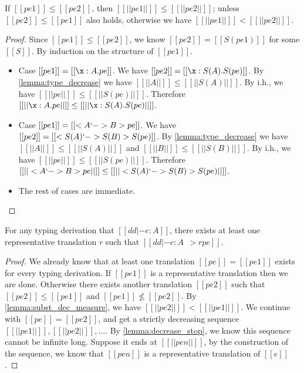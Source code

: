 \begin{lemma}
  \label{lemma:subst_dec_measure}
  If $[[pe1]] \leq [[pe2]]$, then $ {[[ ||pe1|| ]]} \leq [[ ||pe2|| ]]$; unless
  $[[pe2]] \leq [[pe1]]$ also holds, otherwise we have $[[ ||pe1|| ]] < [[ ||pe2|| ]]$.
\end{lemma}
\begin{proof}
  Since $[[ pe1  ]] \leq [[  pe2  ]]$, we know $[[ pe2  ]] = [[ S(pe1)  ]]$ for some $[[S]]$. By induction on
  the structure of $[[pe1]]$.

  \begin{itemize}
  \item Case $[[pe1]] = [[  \x : A . pe ]]$. We have
    $[[ pe2  ]] = [[  \x : S(A) . S(pe)  ]]$. By \cref{lemma:type_decrease} we have $[[ || A || ]] \leq [[ || S(A) || ]]$.
    By i.h., we have $[[ || pe ||  ]] \leq [[ || S(pe) ||  ]]$. Therefore $[[ || \x : A . pe ||    ]] \leq [[ || \x : S(A) . S(pe) ||  ]]$.
  \item Case $[[pe1]] = [[ < A `-> B > pe  ]]$. We have
    $[[pe2]] = [[ < S(A) `-> S(B) > S(pe)  ]]$.  By \cref{lemma:type_decrease} we have $[[ || A || ]] \leq [[ || S(A) || ]]$
    and $[[ || B || ]] \leq [[ || S(B) || ]]$. By i.h., we have $[[ || pe ||  ]] \leq [[ || S(pe) ||  ]]$.
    Therefore $[[  || < A `-> B > pe ||  ]] \leq [[ || < S(A) `-> S(B) > S(pe)  ||   ]]$.

  \item The rest of cases are immediate.
  \end{itemize}

\end{proof}


\begin{lemma}
  For any typing derivation that $[[dd |- e : A]]$, there exists at least one representative
  translation $r$ such that $[[dd |- e : A ~~> rpe]]$.
\end{lemma}
\begin{proof}
We already know that at least one translation $[[pe]] = [[pe1]]$ exists
for every typing derivation. If $[[pe1]]$ is a representative translation then we
are done. Otherwise there exists another translation $[[pe2]]$ such that
$[[pe2]] \leq [[pe1]]$ and $ [[pe1]] \not \leq [[pe2]]$. By
\cref{lemma:subst_dec_measure}, we have $[[||pe2||]] < [[ ||pe1|| ]]$. We continue
with $[[pe]] = [[pe2]]$, and get a strictly decreasing sequence $[[ || pe1 ||  ]], [[ || pe2 || ]], \dots$.
By \cref{lemma:decrease_stop}, we know this sequence cannot be infinite long. Suppose it ends at $[[ || pen || ]]$,
by the construction of the sequence, we know that $[[pen]]$ is a representative translation of $[[e]]$.
\end{proof}


